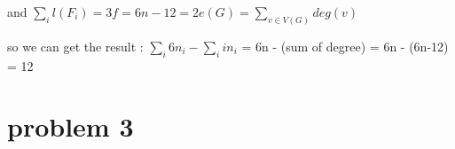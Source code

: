 \documentclass{article}
\begin{document}
\begin{CJK*}{UTF8}{bkai}
and $\sum_{i} l(F_{i}) = 3f = 6n-12 = 2e(G) = \sum_{v \in V(G)} deg(v)$

so we can get the result : $\sum_{i} 6n_{i} - \sum_{i} in_{i}$ = 6n - (sum of degree) = 6n - (6n-12) = 12

\section*{problem 3}




\end{CJK*}
\end{document}

